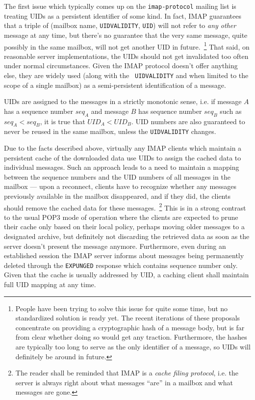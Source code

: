 \documentclass[trojita]{subfiles}
\begin{document}
The first issue which typically comes up on the {\tt imap-protocol} mailing list is treating UIDs as a persistent
identifier of some kind.  In fact, IMAP guarantees that a triple of (mailbox name, {\tt UIDVALIDITY}, {\tt UID}) will
not refer to {\em any other} message at any time, but there's no guarantee that the very same message, quite possibly in
the same mailbox, will not get another UID in future.~\footnote{People have been trying to solve this issue for quite
some time, but no standardized solution is ready yet.  The recent iterations of these proposals concentrate on providing
a cryptographic hash of a message body, but is far from clear whether doing so would get any traction.  Furthermore, the
hashes are typically too long to serve as the only identifier of a message, so UIDs will definitely be around in
future.}  That said, on reasonable server implementations, the UIDs should not get invalidated too often under normal
circumstances.  Given the IMAP protocol doesn't offer anything else, they are widely used (along with the {\tt
UIDVALIDITY} and when limited to the scope of a single mailbox) as a semi-persistent identification of a message.

UIDs are assigned to the messages in a strictly monotonic sense, i.e. if message $A$ has a sequence number $seq_A$ and
message $B$ has sequence number $seq_B$ such as $seq_A < seq_B$, it is true that $UID_A < UID_B$.  UID numbers are also
guaranteed to never be reused in the same mailbox, unless the {\tt UIDVALIDITY} changes.

Due to the facts described above, virtually any IMAP clients which maintain a persistent cache of the downloaded data
use UIDs to assign the cached data to individual messages.  Such an approach leads to a need to maintain a mapping
between the sequence numbers and the UID numbers of all messages in the mailbox --- upon a reconnect, clients have to
recognize whether any messages previously available in the mailbox disappeared, and if they did, the clients should
remove the cached data for these messages.~\footnote{The reader shall be reminded that IMAP is a {\em cache filing
protocol}, i.e. the server is always right about what messages ``are'' in a mailbox and what messages are gone.}  This
is in a strong contrast to the usual POP3 mode of operation where the clients are expected to prune their cache only
based on their local policy, perhaps moving older messages to a designated archive, but definitely not discarding the
retrieved data as soon as the server doesn't present the message anymore.  Furthermore, even during an established
session the IMAP server informs about messages being permanently deleted through the {\tt EXPUNGED} response which
contains sequence number only.  Given that the cache is usually addressed by UID, a caching client shall maintain full
UID mapping at any time.
\end{document}
